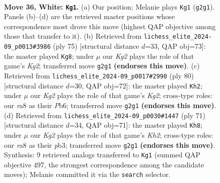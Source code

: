 \documentclass[11pt]{article}
\begin{document}
\clearpage

\begin{figure}[p]\centering
\begin{subfigure}{0.46\textwidth}\centering
\resizebox{\linewidth}{!}{%
\newchessgame
\chessboard[
  setfen={r7/6Qp/3pkp2/8/pP2q3/6P1/P4PKP/8 w - - 7 36},
  showmover=false,
  pgfstyle=straightmove, color=movearrow, markmove={g2-g1}
]}
\caption{}
\end{subfigure}\hfill
\begin{subfigure}{0.46\textwidth}\centering
\resizebox{\linewidth}{!}{%
\newchessgame
\chessboard[
  setfen={8/5pk1/6pp/4Q3/p7/P2qP2P/5PP1/6K1 b - - 2 38},
  showmover=false,
  pgfstyle=straightmove, color=movearrow, markmove={g7-g8}
]}
\caption{}
\end{subfigure}
\\[4pt]
\begin{subfigure}{0.46\textwidth}\centering
\resizebox{\linewidth}{!}{%
\newchessgame
\chessboard[
  setfen={7k/1p3Qp1/1Pp4p/8/p3q2P/P5P1/5PK1/8 w - - 0 41},
  showmover=false,
  pgfstyle=straightmove, color=movearrow, markmove={g2-h2}
]}
\caption{}
\end{subfigure}\hfill
\begin{subfigure}{0.46\textwidth}\centering
\resizebox{\linewidth}{!}{%
\newchessgame
\chessboard[
  setfen={8/6pk/1p5p/2p2Q2/4P3/1Pq3P1/5PP1/6K1 b - - 1 36},
  showmover=false,
  pgfstyle=straightmove, color=movearrow, markmove={h7-h8}
]}
\caption{}
\end{subfigure}
\caption{\textbf{Move 36, White: \texttt{Kg1}.} (a) Our position; Melanie plays \texttt{Kg1} (\texttt{g2g1}). Panels (b)--(d) are the retrieved master positions whose correspondence most drove this move (highest QAP objective among those that transfer to it). (b) Retrieved from \texttt{lichess\_elite\_2024-09\_p0013\#3986} (ply 75) [structural distance $d$=33, QAP obj=73]: the master played \texttt{Kg8}; under $\mu$ our \emph{Kg2} plays the role of that game's \emph{Kg2}; transferred move \texttt{g2g1} \textbf{(endorses this move)}. (c) Retrieved from \texttt{lichess\_elite\_2024-09\_p0017\#2990} (ply 80) [structural distance $d$=30, QAP obj=72]: the master played \texttt{Kh2}; under $\mu$ our \emph{Kg2} plays the role of that game's \emph{Kg2}; cross-type roles: our \emph{r}a8 as their \emph{P}b6; transferred move \texttt{g2g1} \textbf{(endorses this move)}. (d) Retrieved from \texttt{lichess\_elite\_2024-09\_p0030\#1447} (ply 71) [structural distance $d$=34, QAP obj=71]: the master played \texttt{Kh8}; under $\mu$ our \emph{Kg2} plays the role of that game's \emph{Kh2}; cross-type roles: our \emph{r}a8 as their \emph{p}b3; transferred move \texttt{g2g1} \textbf{(endorses this move)}. Synthesis: 9 retrieved analogs transferred to \texttt{Kg1} (summed QAP objective 497, the strongest correspondence among the candidate moves); Melanie committed it via the \texttt{search} selector.}
\label{fig:thought-m70}
\end{figure}
\end{document}
